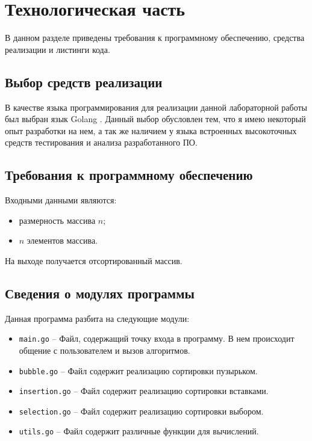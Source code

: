 \chapter{Технологическая часть}

В данном разделе приведены требования к программному обеспечению, средства реализации и листинги кода.

\section{Выбор средств реализации}

В качестве языка программирования для реализации данной лабораторной работы был выбран язык Golang \cite{golang}. Данный выбор обусловлен тем, что я имею некоторый опыт разработки на нем, а так же наличием у языка встроенных высокоточных средств тестирования и анализа разработанного ПО. 

\section{Требования к программному обеспечению}

Входными данными являются:
\begin{itemize}
    \item размерность массива $n$;
    \item $n$ элементов массива.
\end{itemize}

На выходе получается отсортированный массив.


\section{Сведения о модулях программы}

Данная программа разбита на следующие модули:
\begin{itemize}
\item \texttt{main.go} -- Файл, содержащий точку входа в программу. В нем происходит общение с пользователем и вызов алгоритмов.
\item \texttt{bubble.go} -- Файл содержит реализацию сортировки пузырьком.
\item \texttt{insertion.go} -- Файл содержит реализацию сортировки вставками.
\item \texttt{selection.go} -- Файл содержит реализацию сортировки выбором.
\item \texttt{utils.go} -- Файл содержит различные функции для вычислений.
\end{itemize}

